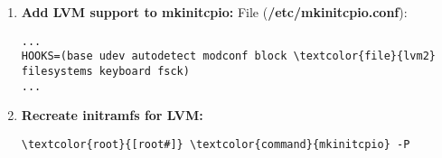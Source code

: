 \documentclass[10pt, a4paper, onecolumn, openany]{book} %
\begin{document}
\begin{enumerate}
    \item \textbf{Add LVM support to mkinitcpio:}
\newline File (\textbf{\textcolor{file}{/etc/mkinitcpio.conf}}):
\begin{Verbatim}[commandchars=\\\{\}]
...
HOOKS=(base udev autodetect modconf block \textcolor{file}{lvm2} filesystems keyboard fsck)
...
\end{Verbatim}

    \item \textbf{Recreate initramfs for LVM:}
\begin{Verbatim}[commandchars=\\\{\}]
\textcolor{root}{[root#]} \textcolor{command}{mkinitcpio} -P
\end{Verbatim}
\end{enumerate}
\end{document}
